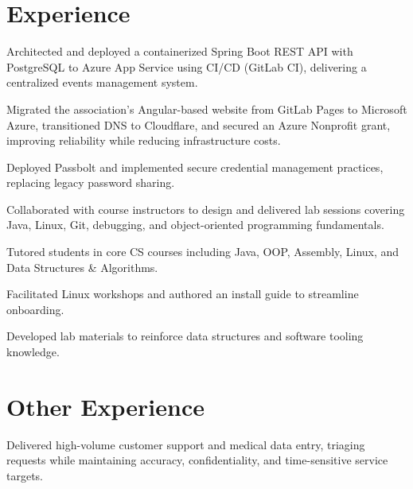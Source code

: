 \documentclass[letterpaper,10pt]{article}
\begin{document}
\section{Experience}


\begin{resume_list}
\item Architected and deployed a containerized Spring Boot REST API with PostgreSQL to Azure App Service using CI/CD (GitLab CI), delivering a centralized events management system.
\item Migrated the association's Angular-based website from GitLab Pages to Microsoft Azure, transitioned DNS to Cloudflare, and secured an Azure Nonprofit grant, improving reliability while reducing infrastructure costs.
\item Deployed Passbolt and implemented secure credential management practices, replacing legacy password sharing.
\end{resume_list}

\begin{resume_list}
\item Collaborated with course instructors to design and delivered lab sessions covering Java, Linux, Git, debugging, and object-oriented programming fundamentals.
\item Tutored students in core CS courses including Java, OOP, Assembly, Linux, and Data Structures \& Algorithms.
\item Facilitated Linux workshops and authored an install guide to streamline onboarding. {\footnotesize {}}
\item Developed lab materials to reinforce data structures and software tooling knowledge. {\footnotesize {}}
\end{resume_list}

\newpage

\section{Other Experience}

\begin{resume_list}
\item Delivered high-volume customer support and medical data entry, triaging requests while maintaining accuracy, confidentiality, and time-sensitive service targets.
\end{resume_list}
\end{document}
